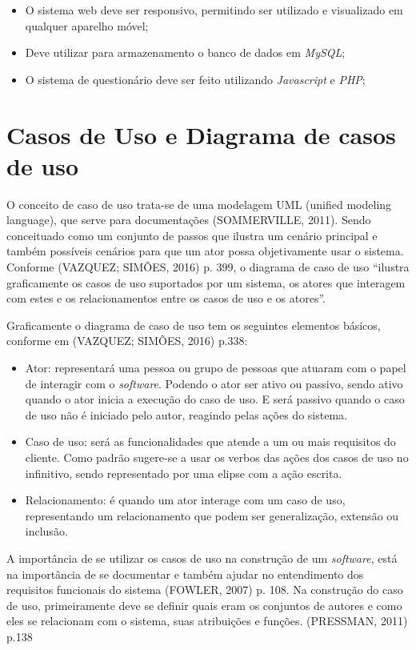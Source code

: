 \documentclass[
	12pt,				%
	openright,			%
	oneside,			%
	a4paper,			%
	english,			%
	french,				%
	spanish,			%
	brazil,				%
	]{abntex2}
\begin{document}
\begin{itemize}
\item O sistema web deve ser responsivo, permitindo ser utilizado e visualizado em qualquer aparelho móvel;
\item Deve utilizar para armazenamento o banco de dados em \textit{MySQL};
\item O sistema de questionário deve ser feito utilizando \textit{Javascript} e \textit{PHP};
\end{itemize}

\section{Casos de Uso e Diagrama de casos de uso}

O conceito de caso de uso trata-se de uma modelagem UML (unified modeling language), que serve para documentações (SOMMERVILLE, 2011). Sendo conceituado como um conjunto de passos que ilustra um cenário principal e também possíveis cenários para que um ator possa objetivamente usar o sistema. Conforme (VAZQUEZ; SIMÕES, 2016) p. 399, o diagrama de caso de uso “ilustra graficamente os casos de uso suportados por um sistema, os atores que interagem com estes e os relacionamentos entre os casos de uso e os atores”.

Graficamente o diagrama de caso de uso tem os seguintes elementos básicos, conforme em (VAZQUEZ; SIMÕES, 2016) p.338:

\begin{itemize}
\item Ator: representará uma pessoa ou grupo de pessoas que atuaram com o papel de interagir com o \textit{software}. Podendo o ator ser ativo ou passivo, sendo ativo quando o ator inicia a execução do caso de uso. E será passivo quando o caso de uso não é iniciado pelo autor, reagindo pelas ações do sistema.
\item Caso de uso: será as funcionalidades que atende a um ou mais requisitos do cliente. Como padrão sugere-se a usar os verbos das ações dos casos de uso no infinitivo, sendo representado por uma elipse com a ação escrita.
\item Relacionamento: é quando um ator interage com um caso de uso, representando um relacionamento que podem ser generalização, extensão ou inclusão.
\end{itemize}

A importância de se utilizar os casos de uso na construção de um \textit{software}, está na importância de se documentar e também ajudar no entendimento dos requisitos funcionais do sistema (FOWLER, 2007) p. 108. Na construção do caso de uso, primeiramente deve se definir quais eram os conjuntos de autores e como eles se relacionam com o sistema, suas atribuições e funções. (PRESSMAN, 2011) p.138
\end{document}
